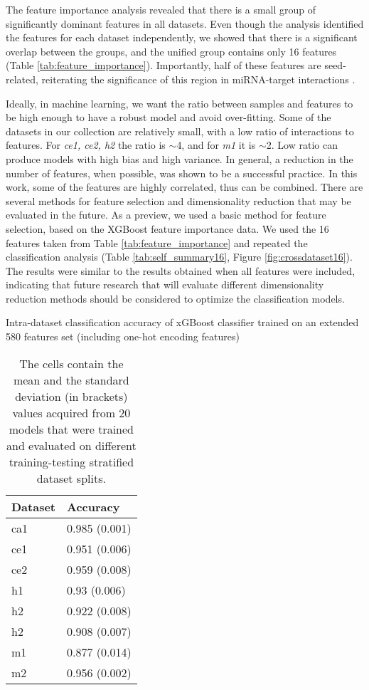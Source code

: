 The feature importance analysis revealed that there is a small group of significantly dominant features in all datasets. Even though the analysis identified the features for each dataset independently, we showed that there is a significant overlap between the groups, and the unified group contains only 16 features (Table \ref{tab:feature_importance}). Importantly, half of these features are seed-related, reiterating the significance of this region in miRNA-target interactions \cite{agarwal2015predicting}.

Ideally, in machine learning, we want the ratio between samples and features to be high enough to have a robust model and avoid over-fitting. Some of the datasets in our collection are relatively small, with a low ratio of interactions to features. For \textit{ce1, ce2, h2} the ratio is $\sim$4, and for \textit{m1} it is $\sim$2. Low ratio can produce models with high bias and high variance. In general, a reduction in the number of features, when possible, was shown to be a successful practice. In this work, some of the features are highly correlated, thus can be combined. There are several methods for feature selection and dimensionality reduction that may be evaluated in the future. As a preview, we used a basic method for feature selection, based on the XGBoost feature importance data. We used the 16 features taken from Table \ref{tab:feature_importance} and repeated the classification analysis (Table \ref{tab:self_summary16}, Figure \ref{fig:crossdataset16}). The results were similar to the results obtained when all features were included, indicating that future research that will evaluate different dimensionality reduction methods should be considered to optimize the classification models. 


\begin{table}[h!]
\caption{Intra-dataset classification accuracy of xGBoost classifier trained on an extended 580 features set (including one-hot encoding features)}
\label{tab:resultswithrawfeature}
\centering
\begin{tabular}{|l|l|}
\hline
\textbf{Dataset} & \textbf{Accuracy}      \\ \hline
ca1     & 0.985 (0.001) \\ \hline
ce1     & 0.951 (0.006) \\ \hline
ce2     & 0.959 (0.008) \\ \hline
h1      & 0.93 (0.006)  \\ \hline
h2      & 0.922 (0.008) \\ \hline
h2      & 0.908 (0.007) \\ \hline
m1      & 0.877 (0.014) \\ \hline
m2      & 0.956 (0.002) \\ \hline
\end{tabular}
\bigbreak
\caption*{The cells contain the mean and the standard deviation (in brackets) values acquired from 20 models that were trained and evaluated on different training-testing stratified dataset splits.}
\end{table}



